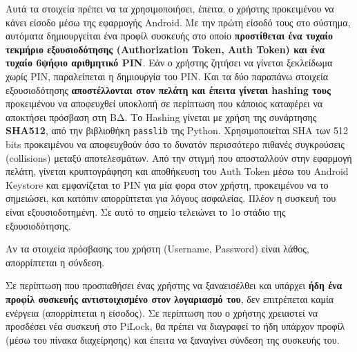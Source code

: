 		Αυτά τα στοιχεία πρέπει να τα χρησιμοποιήσει, έπειτα, ο χρήστης προκειμένου να κάνει είσοδο μέσω της εφαρμογής Android. Με την πρώτη είσοδό τους στο σύστημα, αυτόματα δημιουργείται ένα προφίλ συσκευής στο οποίο \textbf{προστίθεται ένα τυχαίο τεκμήριο εξουσιοδότησης (Authorization Token, Auth Token) και ένα τυχαίο 6ψήφιο αριθμητικό PIN}. Εάν ο χρήστης ζητήσει να γίνεται ξεκλείδωμα χωρίς PIN, παραλείπεται η δημιουργία του PIN. Και τα δύο παραπάνω στοιχεία εξουσιοδότησης \textbf{αποστέλλονται στον πελάτη και έπειτα γίνεται hashing τους} προκειμένου να αποφευχθεί υποκλοπή σε περίπτωση που κάποιος καταφέρει να αποκτήσει πρόσβαση στη ΒΔ. Το Hashing γίνεται με χρήση της συνάρτησης \textbf{SHA512}, από την βιβλιοθήκη \verb|passlib| της Python. Χρησιμοποιείται SHA των 512 bits προκειμένου να αποφευχθούν όσο το δυνατόν περισσότερο πιθανές συγκρούσεις (collisions) μεταξύ αποτελεσμάτων. Από την στιγμή που αποσταλλούν στην εφαρμογή πελάτη, γίνεται κρυπτογράφηση και αποθήκευση του Auth Token μέσω του Android Keystore και εμφανίζεται το PIN για μία φορα στον χρήστη, προκειμένου να το σημειώσει, και κατόπιν απορρίπτεται για λόγους ασφαλείας. Πλέον η συσκευή του είναι εξουσιοδοτημένη. Σε αυτό το σημείο τελειώνει το 1ο στάδιο της εξουσιοδότησης.

		Αν τα στοιχεία πρόσβασης του χρήστη (Username, Password) είναι λάθος, απορρίπτεται η σύνδεση.

		Σε περίπτωση που προσπαθήσει ένας χρήστης να ξαναεισέλθει και υπάρχει \textbf{ήδη ένα προφίλ συσκευής αντιστοιχισμένο στον λογαριασμό του}, δεν επιτρέπεται καμία ενέργεια (απορρίπτεται η είσοδος). Σε περίπτωση που ο χρήστης χρειαστεί να προσδέσει νέα συσκευή στο PiLock, θα πρέπει να διαγραφεί το ήδη υπάρχον προφίλ (μέσω του πίνακα διαχείρησης) και έπειτα να ξαναγίνει σύνδεση της συσκευής του.

